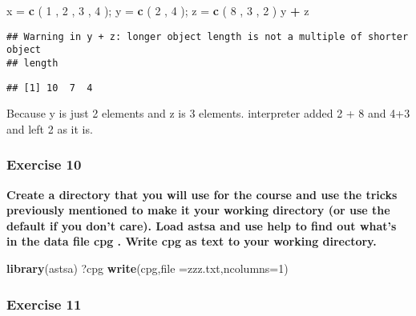 \documentclass[
]{article}
\newenvironment{Shaded}{\begin{snugshade}}{\end{snugshade}}
\newcommand{\DataTypeTok}[1]{\textcolor[rgb]{0.13,0.29,0.53}{#1}}
\newcommand{\DecValTok}[1]{\textcolor[rgb]{0.00,0.00,0.81}{#1}}
\newcommand{\KeywordTok}[1]{\textcolor[rgb]{0.13,0.29,0.53}{\textbf{#1}}}
\newcommand{\NormalTok}[1]{#1}
\newcommand{\OperatorTok}[1]{\textcolor[rgb]{0.81,0.36,0.00}{\textbf{#1}}}
\newcommand{\StringTok}[1]{\textcolor[rgb]{0.31,0.60,0.02}{#1}}
\begin{document}
\begin{Shaded}
\begin{Highlighting}[]
\NormalTok{x =}\StringTok{ }\KeywordTok{c}\NormalTok{ ( }\DecValTok{1}\NormalTok{ , }\DecValTok{2}\NormalTok{ , }\DecValTok{3}\NormalTok{ , }\DecValTok{4}\NormalTok{ ); y =}\StringTok{ }\KeywordTok{c}\NormalTok{ ( }\DecValTok{2}\NormalTok{ , }\DecValTok{4}\NormalTok{ ); z =}\StringTok{ }\KeywordTok{c}\NormalTok{ ( }\DecValTok{8}\NormalTok{ , }\DecValTok{3}\NormalTok{ , }\DecValTok{2}\NormalTok{ )}
\NormalTok{y }\OperatorTok{+}\StringTok{ }\NormalTok{z}
\end{Highlighting}
\end{Shaded}

\begin{verbatim}
## Warning in y + z: longer object length is not a multiple of shorter object
## length
\end{verbatim}

\begin{verbatim}
## [1] 10  7  4
\end{verbatim}

Because y is just 2 elements and z is 3 elements. interpreter added 2 +
8 and 4+3 and left 2 as it is.

\hypertarget{exercise-10}{%
\subsubsection{Exercise 10}\label{exercise-10}}

\textbf{Create a directory that you will use for the course and use the
tricks previously mentioned to make it your working directory (or use
the default if you don't care). Load astsa and use help to find out
what's in the data file cpg . Write cpg as text to your working
directory.}

\begin{Shaded}
\begin{Highlighting}[]
\KeywordTok{library}\NormalTok{(astsa)}
\NormalTok{?cpg}
\KeywordTok{write}\NormalTok{(cpg,}\DataTypeTok{file =}\StringTok{\textquotesingle{}zzz.txt\textquotesingle{}}\NormalTok{,}\DataTypeTok{ncolumns=}\DecValTok{1}\NormalTok{)}
\end{Highlighting}
\end{Shaded}

\hypertarget{exercise-11}{%
\subsubsection{Exercise 11}\label{exercise-11}}
\end{document}

